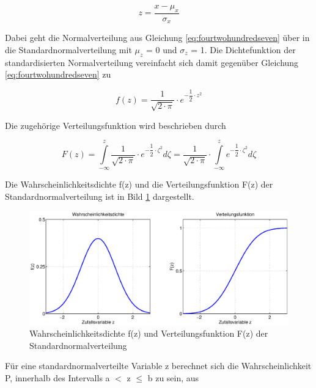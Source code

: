 \begin{equation}\label{eq:fourtwohundredten}
z=\dfrac{x-\mu _{x} }{\sigma _{x} }
\end{equation}

\noindent Dabei geht die Normalverteilung aus Gleichung \eqref{eq:fourtwohundredseven} \"{u}ber in die Standardnormalverteilung mit $\mu _{z}$ = 0 und $\sigma _{z}$ = 1. Die Dichtefunktion der standardisierten Normalverteilung vereinfacht sich damit gegen\"{u}ber Gleichung \eqref{eq:fourtwohundredseven} zu

\begin{equation}\label{eq:fourtwohundredeleven}
f(z)=\dfrac{1}{\sqrt{2\cdot \pi }} \cdot e^{-\dfrac{1}{2} \cdot z^{2}}
\end{equation}

\noindent Die zugeh\"{o}rige Verteilungsfunktion wird beschrieben durch

\begin{equation}\label{eq:fourtwohundredtwelve}
F(z)=\int\limits  _{-\infty }^{z}\dfrac{1}{\sqrt{2\cdot \pi}} \cdot e^{-\dfrac{1}{2} \cdot \zeta ^{2}}  d\zeta =\dfrac{1}{\sqrt{2\cdot \pi}} \cdot \int\limits  _{-\infty }^{z}e^{-\dfrac{1}{2} \cdot \zeta ^{2}}  d\zeta
\end{equation}

\noindent Die Wahrscheinlichkeitsdichte f(z) und die Verteilungsfunktion F(z) der Standardnormalverteilung ist in Bild \ref{fig:Stetig_Normalverteilung3} dargestellt.

\begin{figure}[H]
  \centerline{\includegraphics[width=1\textwidth]{Kapitel4/Bilder/image36}}
  \caption{Wahrscheinlichkeitsdichte f(z) und Verteilungsfunktion F(z) der Standardnormalverteilung}
  \label{fig:Stetig_Normalverteilung3}
\end{figure}

\noindent F\"{u}r eine standardnormalverteilte Variable z berechnet sich die Wahrscheinlichkeit P, innerhalb des Intervalls a $\mathrm{<}$ z $\leq$ b zu sein, aus 

